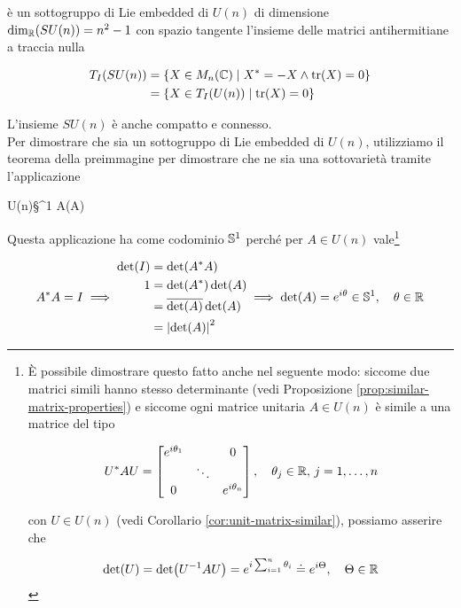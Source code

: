 è un sottogruppo di Lie embedded di $ U(n) $ di dimensione $ \dim_{\R}(SU(n)) = n^{2} - 1 $ con spazio tangente l'insieme delle matrici antihermitiane a traccia nulla

\begin{align}
	\begin{split}
		T_{I}(SU(n)) &= \{ X \in M_{n}(\C) \mid X^{*} = -X \wedge \tr(X) = 0 \} \\
		&= \{ X \in T_{I}(U(n)) \mid \tr(X) = 0 \}
	\end{split}
\end{align}

L'insieme $ SU(n) $ è anche compatto e connesso.\\
Per dimostrare che sia un sottogruppo di Lie embedded di $ U(n) $, utilizziamo il teorema della preimmagine per dimostrare che ne sia una sottovarietà tramite l'applicazione

	{U(n)}{\S^{1}}
	{A}{\det(A)}

Questa applicazione ha come codominio $ \S^{1} $ perché per $ A \in U(n) $ vale\footnote{%
	È possibile dimostrare questo fatto anche nel seguente modo: siccome due matrici simili hanno stesso determinante (vedi Proposizione \ref{prop:similar-matrix-properties}) e siccome ogni matrice unitaria $ A \in U(n) $ è simile a una matrice del tipo
	
	\begin{equation*}
		U^{*} A U = %
		\bmqty{ %
				\dmat{ %
						e^{i \theta_{1}} & & 0 \\
						& \ddots & \\
						0 & & e^{i \theta_{n}} %
						}
				} %
		\qcomma \theta_{j} \in \R, \, j=1,\dots,n
	\end{equation*}
	
	con $ U \in U(n) $ (vedi Corollario \ref{cor:unit-matrix-similar}), possiamo asserire che
	
	\begin{equation*}
		\det(U) = \det(U^{-1} A U) %
		= e^{i \sum_{i=1}^{n} \theta_{i}} %
		\doteq e^{i \Theta} %
		\qcomma \Theta \in \R
	\end{equation*}
}

\begin{equation}
	A^{*} A = I %
	\implies %
	\begin{aligned}
		\det(I) &= \det(A^{*} A) \\
		1 &= \det(A^{*}) \det(A) \\
		&= \overline{\det(A)} \det(A) \\
		&= \abs{\det(A)}^{2}
	\end{aligned} %
	\implies %
	\det(A) = e^{i \theta} \in \S^{1} \qcomma \theta \in \R
\end{equation}

